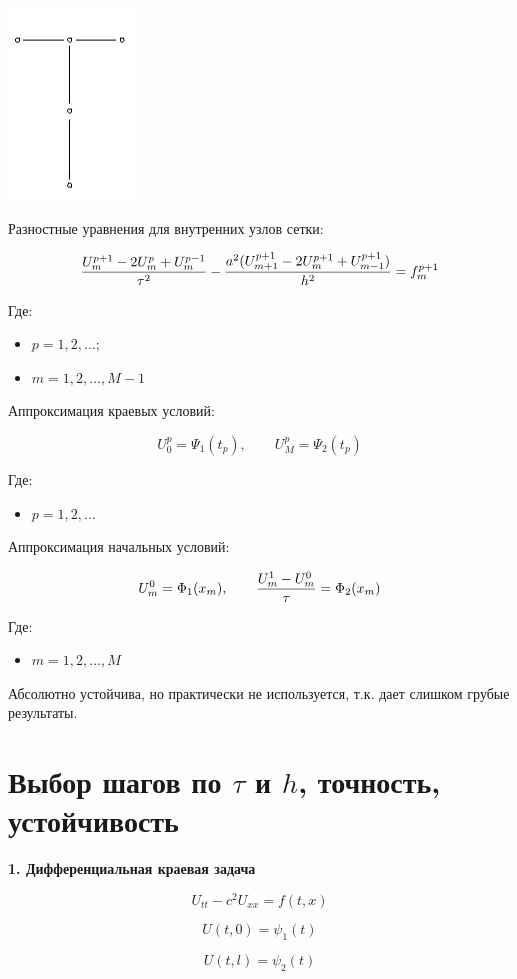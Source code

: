 \documentclass[a4paper]{article}
\begin{document}
\includegraphics{img/2.jpg}

Разностные уравнения для внутренних узлов сетки:

$${U_m^{p+1}-2U_m^p+U_m^{p-1} \over \tau^2} - {a^2(U_{m+1}^{p+1}-2U_m^{p+1}+U_{m-1}^{p+1}) \over h^2} = f_m^{p+1}$$

Где:
\begin{itemize}
    \item $p=1,2,...; $
    \item $ m=1,2,...,M-1 $
\end{itemize}

Аппроксимация краевых условий:

$$ U_0^p = \Psi_1(t_p), \qquad U_M^p=\Psi_2(t_p)$$

Где:
\begin{itemize}
    \item $p=1,2,...$
\end{itemize}

Аппроксимация начальных условий:

$$U_m^0=\Phi_1(x_m), \qquad {U_m^1-U_m^0 \over \tau} = \Phi_2(x_m)$$

Где:
\begin{itemize}
    \item $m=1,2,...,M$
\end{itemize}

Абсолютно устойчива, но практически не используется, т.к. дает слишком грубые результаты.

\newpage

\section{Выбор шагов по $\tau$ и $h$, точность, устойчивость}

\textbf{1. Дифференциальная краевая задача}

$$U_{tt}-c^2U_{xx}=f(t,x)$$

$$U(t,0)=\psi_1(t)$$

$$U(t,l)=\psi_2(t)$$
\end{document}
